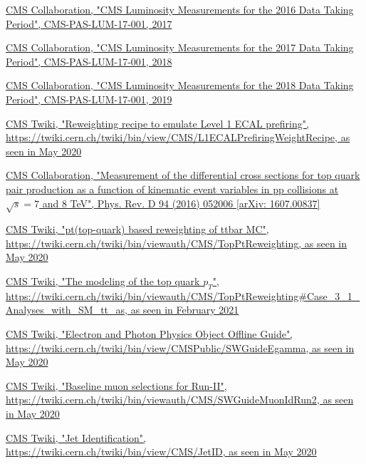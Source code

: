 \documentclass[a4paper, 10pt, openright]{report}
\begin{document}
\begin{thebibliography}{1}
\href{https://cds.cern.ch/record/2257069}{CMS Collaboration,
"CMS Luminosity Measurements for the 2016 Data Taking Period",
CMS-PAS-LUM-17-001, 2017}

\href{http://inspirehep.net/record/1677076}{CMS Collaboration,
"CMS Luminosity Measurements for the 2017 Data Taking Period",
CMS-PAS-LUM-17-001, 2018}

\href{http://inspirehep.net/record/1736713/}{CMS Collaboration,
"CMS Luminosity Measurements for the 2018 Data Taking Period",
CMS-PAS-LUM-17-001, 2019}

\href{https://twiki.cern.ch/twiki/bin/view/CMS/L1ECALPrefiringWeightRecipe}{\ac{CMS} Twiki,
"Reweighting recipe to emulate Level 1 ECAL prefiring", \url{https://twiki.cern.ch/twiki/bin/view/CMS/L1ECALPrefiringWeightRecipe}, as seen in May 2020}

\href{https://arxiv.org/abs/1607.00837}{CMS Collaboration,
"Measurement of the differential cross sections for top quark pair production as a function of kinematic event variables in pp collisions at $\sqrt{s} = 7$ and 8 TeV",
Phys. Rev. D 94 (2016) 052006 [arXiv: 1607.00837]}

\href{https://twiki.cern.ch/twiki/bin/viewauth/CMS/TopPtReweighting}{\ac{CMS} Twiki,
"pt(top-quark) based reweighting of ttbar MC", \url{https://twiki.cern.ch/twiki/bin/viewauth/CMS/TopPtReweighting}, as seen in May 2020}

\href{https://twiki.cern.ch/twiki/bin/viewauth/CMS/TopPtReweighting\#Case\_3\_1\_Analyses\_with\_SM\_tt\_as}{\ac{CMS} Twiki,
"The modeling of the top quark $p_T$", \url{https://twiki.cern.ch/twiki/bin/viewauth/CMS/TopPtReweighting\#Case\_3\_1\_Analyses\_with\_SM\_tt\_as}, as seen in February 2021}

\href{https://twiki.cern.ch/twiki/bin/view/CMSPublic/SWGuideEgamma}{\ac{CMS} Twiki,
"Electron and Photon Physics Object Offline Guide", \url{https://twiki.cern.ch/twiki/bin/view/CMSPublic/SWGuideEgamma}, as seen in May 2020}

\href{https://twiki.cern.ch/twiki/bin/viewauth/CMS/SWGuideMuonIdRun2}{\ac{CMS} Twiki,
"Baseline muon selections for Run-II", \url{https://twiki.cern.ch/twiki/bin/viewauth/CMS/SWGuideMuonIdRun2}, as seen in May 2020}

\href{https://twiki.cern.ch/twiki/bin/view/CMS/JetID}{\ac{CMS} Twiki,
"Jet Identification", \url{https://twiki.cern.ch/twiki/bin/view/CMS/JetID}, as seen in May 2020}


\end{thebibliography}
\end{document}
